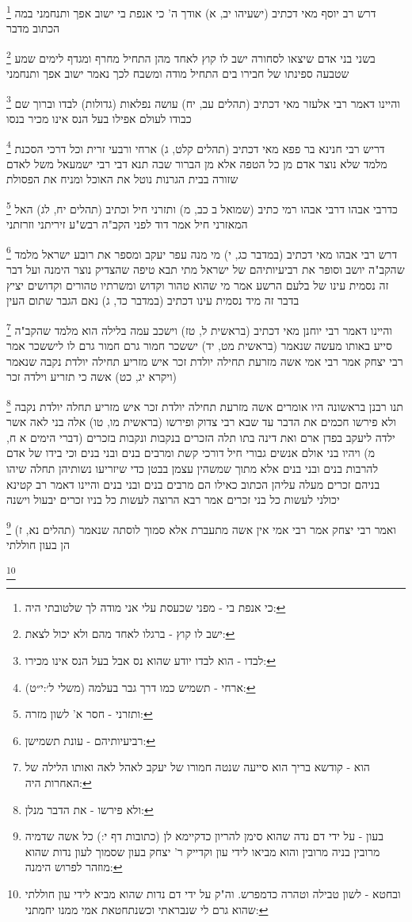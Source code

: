\documentclass[12pt, openany]{book}
\newcommand{\footnotecomment}[1]{
	\renewcommand\thefootnote{}
	\footnote{#1}}
\newcommand{\commenta}[1]{\footnotecomment{#1}}
\begin{document}
{\commenta{כי אנפת בי - מפני שכעסת עלי אני מודה לך שלטובתי היה:}
דרש רב יוסף מאי דכתיב (ישעיהו יב, א) אודך ה' כי אנפת בי ישוב אפך ותנחמני במה הכתוב מדבר 
\commenta{ישב לו קוץ - ברגלו לאחד מהם ולא יכול לצאת:}
בשני בני אדם שיצאו לסחורה ישב לו קוץ לאחד מהן התחיל מחרף ומגדף לימים שמע שטבעה ספינתו של חבירו בים התחיל מודה ומשבח לכך נאמר ישוב אפך ותנחמני 
\commenta{לבדו - הוא לבדו יודע שהוא נס אבל בעל הנס אינו מכירו:}
והיינו דאמר רבי אלעזר מאי דכתיב (תהלים עב, יח) עושה נפלאות (גדולות) לבדו וברוך שם כבודו לעולם אפילו בעל הנס אינו מכיר בנסו 
\commenta{ארחי - תשמיש כמו דרך גבר בעלמה (משלי ל׳:י״ט):}
דריש רבי חנינא בר פפא מאי דכתיב (תהלים קלט, ג) ארחי ורבעי זרית וכל דרכי הסכנת מלמד שלא נוצר אדם מן כל הטפה אלא מן הברור שבה תנא דבי רבי ישמעאל משל לאדם שזורה בבית הגרנות נוטל את האוכל ומניח את הפסולת 
\commenta{ותזרני - חסר א' לשון מזרה:}
כדרבי אבהו דרבי אבהו רמי כתיב (שמואל ב כב, מ) ותזרני חיל וכתיב (תהלים יח, לג) האל המאזרני חיל אמר דוד לפני הקב"ה רבש"ע זיריתני וזרזתני 
\commenta{רביעיותיהם - עונת תשמישן:}
דרש רבי אבהו מאי דכתיב (במדבר כג, י) מי מנה עפר יעקב ומספר את רובע ישראל מלמד שהקב"ה יושב וסופר את רביעיותיהם של ישראל מתי תבא טיפה שהצדיק נוצר הימנה 
ועל דבר זה נסמית עינו של בלעם הרשע אמר מי שהוא טהור וקדוש ומשרתיו טהורים וקדושים יציץ בדבר זה מיד נסמית עינו דכתיב (במדבר כד, ג) נאם הגבר שתום העין 
\commenta{הוא - קודשא בריך הוא סייעה שנטה חמורו של יעקב לאהל לאה ואותו הלילה של האחרות היה:}
והיינו דאמר רבי יוחנן מאי דכתיב (בראשית ל, טז) וישכב עמה בלילה הוא מלמד שהקב"ה סייע באותו מעשה שנאמר (בראשית מט, יד) יששכר חמור גרם חמור גרם לו ליששכר 
אמר רבי יצחק אמר רבי אמי אשה מזרעת תחילה יולדת זכר איש מזריע תחילה יולדת נקבה שנאמר (ויקרא יג, כט) אשה כי תזריע וילדה זכר 
\commenta{ולא פירשו - את הדבר מנלן:}
תנו רבנן בראשונה היו אומרים אשה מזרעת תחילה יולדת זכר איש מזריע תחלה יולדת נקבה ולא פירשו חכמים את הדבר עד שבא רבי צדוק ופירשו (בראשית מו, טו) אלה בני לאה אשר ילדה ליעקב בפדן ארם ואת דינה בתו תלה הזכרים בנקבות ונקבות בזכרים 
(דברי הימים א ח, מ) ויהיו בני אולם אנשים גבורי חיל דורכי קשת ומרבים בנים ובני בנים וכי בידו של אדם להרבות בנים ובני בנים אלא מתוך
שמשהין עצמן בבטן כדי שיזריעו נשותיהן תחלה שיהו בניהם זכרים מעלה עליהן הכתוב כאילו הם מרבים בנים ובני בנים והיינו דאמר רב קטינא יכולני לעשות כל בני זכרים אמר רבא הרוצה לעשות כל בניו זכרים יבעול וישנה 
\commenta{בעון - על ידי דם נדה שהוא סימן להריון כדקיימא לן (כתובות דף י:) כל אשה שדמיה מרובין בניה מרובין והוא מביאו לידי עון וקדייק ר' יצחק בעון שסמוך לעון נדות שהוא מוזהר לפרוש הימנה:}
ואמר רבי יצחק אמר רבי אמי אין אשה מתעברת אלא סמוך לוסתה שנאמר (תהלים נא, ז) הן בעון חוללתי 
\commenta{ובחטא - לשון טבילה וטהרה כדמפרש. וה"ק על ידי דם נדות שהוא מביא לידי עון חוללתי שהוא גרם לי שנבראתי וכשנתחטאת אמי ממנו יחמתני:}
}
\end{document}

